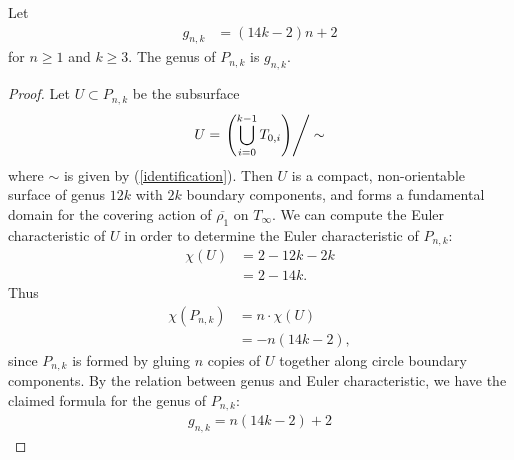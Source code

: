 \begin{lem}
\label{lem:genera}
Let
\begin{align*}
    g_{n,k} &= (14k - 2)n + 2
\end{align*} for $n \geq 1$ and $k \geq 3$.
    The genus of $P_{n,k}$ is $g_{n,k}$.
\end{lem}
\begin{proof}
  Let $U \subset P_{n,k}$ be the subsurface
  \begin{align*}
    U = \left. \left( \bigcup_{i =0}^{k-1} T_{0,i} \right)\right/\sim
  \end{align*}
  where $\sim$ is given by (\ref{identification}).
  Then $U$ is a compact, non-orientable surface of genus $12k$ with $2k$ boundary components, and forms a fundamental domain for the covering action of $\overline{\rho_1}$ on $T_\infty$. We can compute the Euler characteristic of $U$ in order to determine the Euler characteristic of $P_{n,k}$:
  \begin{align*}
    \chi(U) &= 2 - 12k - 2k \\
            &= 2 - 14k.
  \end{align*}
  Thus
  \begin{align*}
    \chi(P_{n,k}) &= n \cdot \chi(U)\\
                  &= -n(14k - 2),
  \end{align*}
  since $P_{n,k}$ is formed by gluing $n$ copies of $U$ together along circle boundary components. By the
  relation between genus and Euler characteristic, we have the claimed formula for the genus of $P_{n,k}:$
  \begin{align*}
    g_{n,k} = n(14k-2) + 2
  \end{align*}
\end{proof}

